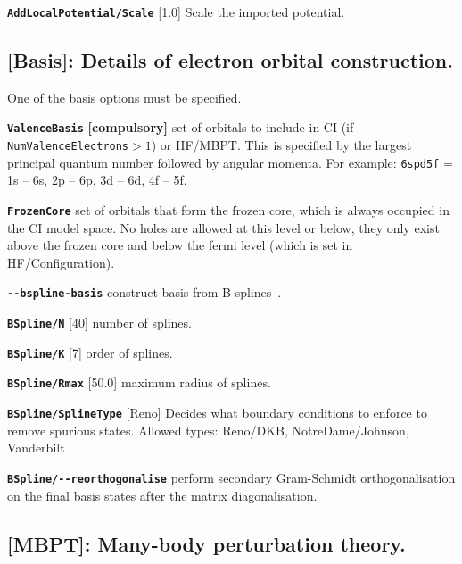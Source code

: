 \documentclass[a4paper,11pt]{article}
\newcommand{\option}[1]{\smallskip\noindent\textbf{\texttt{#1}}}
\begin{document}
\option{AddLocalPotential/Scale} [1.0] Scale the imported potential.

\subsection{[Basis]: Details of electron orbital construction.}
One of the basis options must be specified.

\option{ValenceBasis} \textbf{[compulsory]} set of orbitals to include in CI (if \mbox{\texttt{NumValenceElectrons}$>1$}) or HF/MBPT. This is specified by the largest principal quantum number followed by angular momenta. For example:
\texttt{6spd5f} = 1s -- 6s, 2p -- 6p, 3d -- 6d, 4f -- 5f.

\option{FrozenCore} set of orbitals that form the frozen core, which is always occupied in the CI model space. No holes are allowed at this level or below, they only exist above the frozen core and below the fermi level (which is set in HF/Configuration).

\option{-{}-bspline-basis} construct basis from B-splines~\cite{johnson88pra}.

\option{BSpline/N} [40] number of splines.

\option{BSpline/K} [7]  order of splines.

\option{BSpline/Rmax} [50.0] maximum radius of splines.

\option{BSpline/SplineType} [Reno] Decides what boundary conditions to enforce to remove spurious states. Allowed types: Reno/DKB, NotreDame/Johnson, Vanderbilt

\option{BSpline/-{}-reorthogonalise} perform secondary Gram-Schmidt orthogonalisation on the final basis states after the matrix diagonalisation.


\subsection{[MBPT]: Many-body perturbation theory.}
\end{document}
